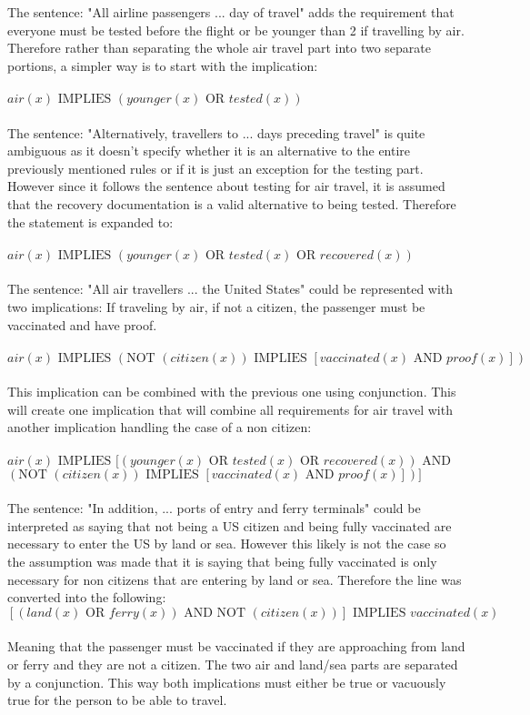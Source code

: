 \documentclass[11pt]{article}
\newcommand{\Implies}{\mbox{ IMPLIES }}
\newcommand{\Or}{\mbox{ OR }}
\renewcommand{\And}{\mbox{ AND }}
\newcommand{\Not}{\mbox{NOT }}
\begin{document}
\begin{enumerate}
\begin{solution}
The sentence: "All airline passengers ...  day of travel" adds the requirement that everyone must be tested before the flight or be younger than 2 if travelling by air. Therefore rather than separating the whole air travel part into two separate portions, a simpler way is to start with the implication:
\\\\
$air(x)\Implies (younger(x) \Or tested(x))$
\\\\
The sentence: "Alternatively, travellers to ... days preceding travel" is quite ambiguous as it doesn't specify whether it is an alternative to the entire previously mentioned rules or if it is just an exception for the testing part. However since it follows the sentence about testing for air travel, it is assumed that the recovery documentation is a valid alternative to being tested. Therefore the statement is expanded to:
\\\\
$air(x)\Implies (younger(x) \Or tested(x) \Or recovered(x))$
\\\\
The sentence: "All  air  travellers ... the  United  States" could be represented with two implications:
If traveling by air, if not a citizen, the passenger must be vaccinated and have proof.
\\\\
$air(x) \Implies (\Not(citizen(x)) \Implies [vaccinated(x)\And proof(x)])$
\\\\
This implication can be combined with the previous one using conjunction. This will create one implication that will combine all requirements for air travel with another implication handling the case of a non citizen:
\\\\
$air(x)\Implies [(younger(x)\Or tested(x) \Or recovered(x)) \And$\\
$(\Not(citizen(x)) \Implies [vaccinated(x)\And proof(x)])]$
\\\\
The sentence: "In  addition, ... ports of entry and ferry terminals" could be interpreted as saying that not being a US citizen and being fully vaccinated are necessary to enter the US by land or sea. However this likely is not the case so the assumption was made that it is saying that being fully vaccinated is only necessary for non citizens that are entering by land or sea. Therefore the line was converted into the following: \\

$\left[ (land(x)\Or ferry(x))\And \Not( citizen(x) ) \right] \Implies vaccinated(x)$\\\\

Meaning that the passenger must be vaccinated if they are approaching from land or ferry and they are not a citizen.
The two air and land/sea parts are separated by a conjunction. This way both implications must either be true or vacuously true for the person to be able to travel.
\end{solution}
\end{enumerate}
\end{document}
